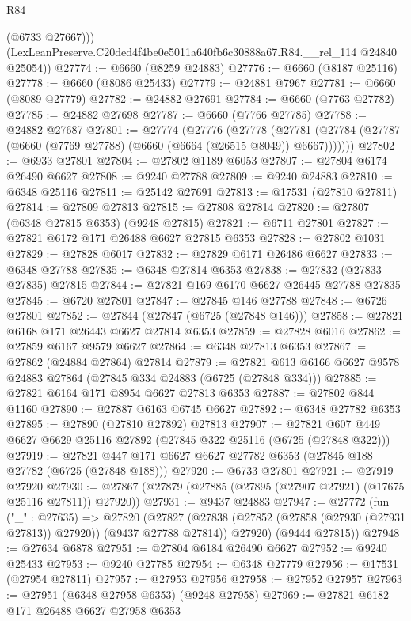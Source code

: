 \begin{lexlean}{R84}
\begin{coremodule}
          (@6733 @27667)))
      (LexLeanPreserve.C20ded4f4be0e5011a640fb6c30888a67.R84.__rel_114 @24840 @25054))
@27774 := @6660 (@8259 @24883)
@27776 := @6660 (@8187 @25116)
@27778 := @6660 (@8086 @25433)
@27779 := @24881 @7967
@27781 := @6660 (@8089 @27779)
@27782 := @24882 @27691
@27784 := @6660 (@7763 @27782)
@27785 := @24882 @27698
@27787 := @6660 (@7766 @27785)
@27788 := @24882 @27687
@27801 := @27774
    (@27776
      (@27778
        (@27781 (@27784 (@27787 (@6660 (@7769 @27788) (@6660 (@6664 (@26515 @8049)) @6667)))))))
@27802 := @6933 @27801
@27804 := @27802 @1189 @6053
@27807 := @27804 @6174 @26490 @6627
@27808 := @9240 @27788
@27809 := @9240 @24883
@27810 := @6348 @25116
@27811 := @25142 @27691
@27813 := @17531 (@27810 @27811)
@27814 := @27809 @27813
@27815 := @27808 @27814
@27820 := @27807 (@6348 @27815 @6353) (@9248 @27815)
@27821 := @6711 @27801
@27827 := @27821 @6172 @171 @26488 @6627 @27815 @6353
@27828 := @27802 @1031
@27829 := @27828 @6017
@27832 := @27829 @6171 @26486 @6627
@27833 := @6348 @27788
@27835 := @6348 @27814 @6353
@27838 := @27832 (@27833 @27835) @27815
@27844 := @27821 @169 @6170 @6627 @26445 @27788 @27835
@27845 := @6720 @27801
@27847 := @27845 @146 @27788
@27848 := @6726 @27801
@27852 := @27844 (@27847 (@6725 (@27848 @146)))
@27858 := @27821 @6168 @171 @26443 @6627 @27814 @6353
@27859 := @27828 @6016
@27862 := @27859 @6167 @9579 @6627
@27864 := @6348 @27813 @6353
@27867 := @27862 (@24884 @27864) @27814
@27879 := @27821 @613 @6166 @6627 @9578 @24883 @27864 (@27845 @334 @24883 (@6725 (@27848 @334)))
@27885 := @27821 @6164 @171 @8954 @6627 @27813 @6353
@27887 := @27802 @844 @1160
@27890 := @27887 @6163 @6745 @6627
@27892 := @6348 @27782 @6353
@27895 := @27890 (@27810 @27892) @27813
@27907 := @27821 @607 @449 @6627 @6629 @25116 @27892 (@27845 @322 @25116 (@6725 (@27848 @322)))
@27919 := @27821 @447 @171 @6627 @6627 @27782 @6353 (@27845 @188 @27782 (@6725 (@27848 @188)))
@27920 := @6733 @27801
@27921 := @27919 @27920
@27930 := @27867 (@27879 (@27885 (@27895 (@27907 @27921) (@17675 @25116 @27811)) @27920))
@27931 := @9437 @24883
@27947 := @27772
    (fun ("_" : @27635) =>
    @27820
      (@27827
        (@27838 (@27852 (@27858 (@27930 (@27931 @27813)) @27920)) (@9437 @27788 @27814))
        @27920)
      (@9444 @27815))
@27948 := @27634 @6878
@27951 := @27804 @6184 @26490 @6627
@27952 := @9240 @25433
@27953 := @9240 @27785
@27954 := @6348 @27779
@27956 := @17531 (@27954 @27811)
@27957 := @27953 @27956
@27958 := @27952 @27957
@27963 := @27951 (@6348 @27958 @6353) (@9248 @27958)
@27969 := @27821 @6182 @171 @26488 @6627 @27958 @6353

\end{coremodule}
\end{lexlean}
